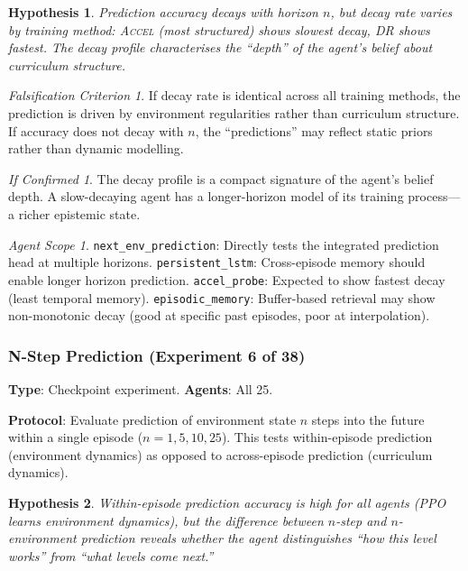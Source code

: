 \documentclass[11pt,a4paper]{article}
\newtheorem{hypothesis}{Hypothesis}[subsection]
\theoremstyle{remark}
\newtheorem*{falsification}{Falsification Criterion}
\newtheorem*{implication}{If Confirmed}
\newtheorem*{agentscope}{Agent Scope}
\newcommand{\accel}{\textsc{Accel}}
\newcommand{\dr}{\textsc{DR}}
\begin{document}
\begin{hypothesis}
Prediction accuracy decays with horizon $n$, but decay rate varies by training method: \accel{} (most structured) shows slowest decay, \dr{} shows fastest. The decay profile characterises the ``depth'' of the agent's belief about curriculum structure.
\end{hypothesis}

\begin{falsification}
If decay rate is identical across all training methods, the prediction is driven by environment regularities rather than curriculum structure. If accuracy does not decay with $n$, the ``predictions'' may reflect static priors rather than dynamic modelling.
\end{falsification}

\begin{implication}
The decay profile is a compact signature of the agent's belief depth. A slow-decaying agent has a longer-horizon model of its training process---a richer epistemic state.
\end{implication}

\begin{agentscope}
\texttt{next\_env\_prediction}: Directly tests the integrated prediction head at multiple horizons. \texttt{persistent\_lstm}: Cross-episode memory should enable longer horizon prediction. \texttt{accel\_probe}: Expected to show fastest decay (least temporal memory). \texttt{episodic\_memory}: Buffer-based retrieval may show non-monotonic decay (good at specific past episodes, poor at interpolation).
\end{agentscope}

\subsubsection{N-Step Prediction (Experiment 6 of 38)}
\label{exp:n_step_prediction}

\textbf{Type}: Checkpoint experiment. \textbf{Agents}: All 25.

\textbf{Protocol}: Evaluate prediction of environment state $n$ steps into the future within a single episode ($n = 1, 5, 10, 25$). This tests within-episode prediction (environment dynamics) as opposed to across-episode prediction (curriculum dynamics).

\begin{hypothesis}
Within-episode prediction accuracy is high for all agents (PPO learns environment dynamics), but the \textit{difference} between $n$-step and $n$-environment prediction reveals whether the agent distinguishes ``how this level works'' from ``what levels come next.''
\end{hypothesis}
\end{document}
